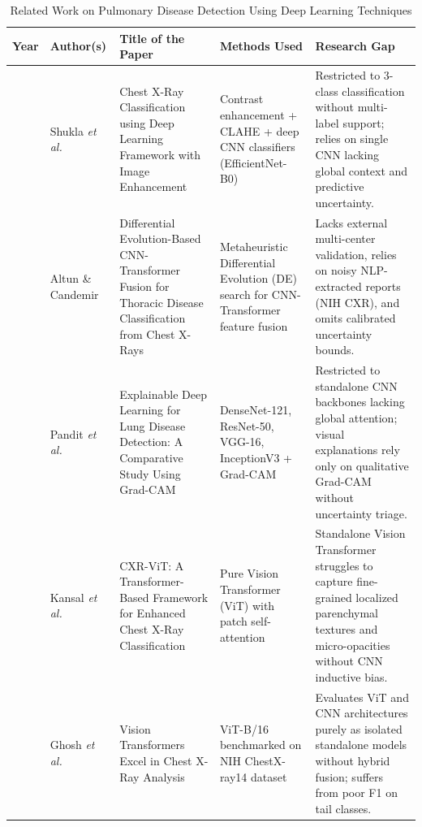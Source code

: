 \documentclass[journal]{IEEEtran}
\begin{document}
\begin{table}[!t]
\renewcommand{\arraystretch}{1.12}
\setlength{\tabcolsep}{1.2pt}
\scriptsize
\caption{Related Work on Pulmonary Disease Detection Using Deep Learning Techniques}
\label{tab:literature_review}
\centering
\begin{tabular}{|>{\centering\arraybackslash}p{0.55cm}|>{\raggedright\arraybackslash}p{1.40cm}|>{\raggedright\arraybackslash}p{1.95cm}|>{\raggedright\arraybackslash}p{1.85cm}|>{\raggedright\arraybackslash}p{2.45cm}|}
\hline
\textbf{Year} & \textbf{Author(s)} & \textbf{Title of the Paper} & \textbf{Methods Used} & \textbf{Research Gap} \\
\hline
2026 & Shukla \textit{et al.} \cite{shukla2026chest} & Chest X-Ray Classification using Deep Learning Framework with Image Enhancement & Contrast enhancement + CLAHE + deep CNN classifiers (EfficientNet-B0) & Restricted to 3-class classification without multi-label support; relies on single CNN lacking global context and predictive uncertainty. \\
\hline
2026 & Altun \& Candemir \cite{altun2026differential} & Differential Evolution-Based CNN-Transformer Fusion for Thoracic Disease Classification from Chest X-Rays & Metaheuristic Differential Evolution (DE) search for CNN-Transformer feature fusion & Lacks external multi-center validation, relies on noisy NLP-extracted reports (NIH CXR), and omits calibrated uncertainty bounds. \\
\hline
2025 & Pandit \textit{et al.} \cite{pandit2025explainable} & Explainable Deep Learning for Lung Disease Detection: A Comparative Study Using Grad-CAM & DenseNet-121, ResNet-50, VGG-16, InceptionV3 + Grad-CAM & Restricted to standalone CNN backbones lacking global attention; visual explanations rely only on qualitative Grad-CAM without uncertainty triage. \\
\hline
2025 & Kansal \textit{et al.} \cite{kansal2025cxr} & CXR-ViT: A Transformer-Based Framework for Enhanced Chest X-Ray Classification & Pure Vision Transformer (ViT) with patch self-attention & Standalone Vision Transformer struggles to capture fine-grained localized parenchymal textures and micro-opacities without CNN inductive bias. \\
\hline
2025 & Ghosh \textit{et al.} \cite{ghosh2025vision} & Vision Transformers Excel in Chest X-Ray Analysis & ViT-B/16 benchmarked on NIH ChestX-ray14 dataset & Evaluates ViT and CNN architectures purely as isolated standalone models without hybrid fusion; suffers from poor F1 on tail classes. \\

\end{tabular}
\end{table}
\end{document}
